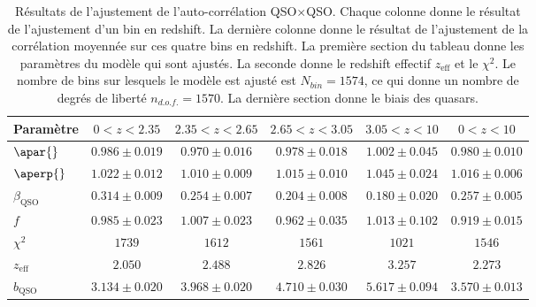 \begin{table}[h]
  \centering
  \caption{Résultats de l'ajustement de l'auto-corrélation QSO$\times$QSO. Chaque colonne donne le résultat de l'ajustement d'un bin en redshift. La dernière colonne donne le résultat de l'ajustement de la corrélation moyennée sur ces quatre bins en redshift. La première section du tableau donne les paramètres du modèle qui sont ajustés. La seconde donne le redshift effectif $z_{\mathrm{eff}}$  et le $\chi^2$. Le nombre de bins sur lesquels le modèle est ajusté est $N_{bin} = \num{1574}$, ce qui donne un nombre de degrés de liberté $n_{d.o.f.} = \num{1570}$. La dernière section donne le biais des quasars.}
  \label{tab:auto_qso_4bins}
  \begin{tabular}{lccccc}
\toprule
Param\`etre  & $\num{0} < z < \num{2.35}$ & $\num{2.35} < z < \num{2.65}$ & $\num{2.65} < z < \num{3.05}$ & $\num{3.05} < z < \num{10}$  & $\num{0} < z < \num{10}$ \\
\midrule
$\apar{} $ & $ 0.986 \pm 0.019$ & $ 0.970 \pm 0.016$ & $ 0.978 \pm 0.018$ & $ 1.002 \pm 0.045$ & $ 0.980 \pm 0.010$ \\
$\aperp{} $ & $ 1.022 \pm 0.012$ & $ 1.010 \pm 0.009$ & $ 1.015 \pm 0.010$ & $ 1.045 \pm 0.024$ & $ 1.016 \pm 0.006$ \\
$\beta_{\mathrm{QSO}} $ & $ 0.314 \pm 0.009$ & $ 0.254 \pm 0.007$ & $ 0.204 \pm 0.008$ & $ 0.180 \pm 0.020$ & $ 0.257 \pm 0.005$ \\
$f$ & $ 0.985 \pm 0.023$ & $ 1.007 \pm 0.023$ & $ 0.962 \pm 0.035$ & $ 1.013 \pm 0.102$ & $ 0.919 \pm 0.015$ \\
\midrule
$\chi^2$ & $ 1739 $ & $ 1612 $ & $ 1561 $ & $ 1021 $ & $ 1546 $ \\
$z_{\mathrm{eff}}$ & $ 2.050 $ & $ 2.488 $ & $ 2.826 $ & $ 3.257 $ & $ 2.273 $ \\
\midrule
$b_{\mathrm{QSO}} $ & $ 3.134 \pm 0.020$ & $ 3.968 \pm 0.020$ & $ 4.710 \pm 0.030$ & $ 5.617 \pm 0.094$ & $ 3.570 \pm 0.013$ \\
\bottomrule
  \end{tabular}
\end{table}
